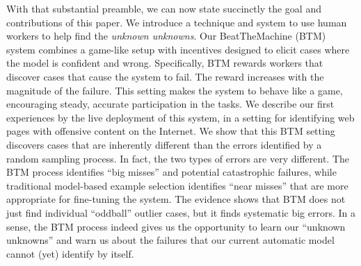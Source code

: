 With that substantial preamble, we can now state succinctly the goal
and contributions of this paper.  We introduce a technique and system
to use human workers to help find the \emph{unknown unknowns}.  Our
BeatTheMachine (BTM) system combines a game-like setup with
incentives designed to elicit cases where the model is confident and
wrong.  Specifically, BTM rewards workers that discover cases that
cause the system to fail. The reward increases with the magnitude of
the failure. This setting makes the system to behave like a game,
encouraging steady, accurate participation in the tasks. We describe
our first experiences by the live deployment of this system, in a
setting for identifying web pages with offensive content on the
Internet. We show that this BTM setting discovers cases that are
inherently different than the errors identified by a random sampling
process. In fact, the two types of errors are very different. The BTM
process identifies ``big misses'' and potential catastrophic failures,
while traditional model-based example selection identifies ``near misses'' that are more
appropriate for fine-tuning the system.  The evidence shows that BTM
does not just find individual ``oddball'' outlier cases, but it finds
systematic big errors.  In a sense, the BTM process indeed gives us
the opportunity to learn our ``unknown unknowns'' and warn us about
the failures that our current automatic model cannot (yet) identify by itself.


